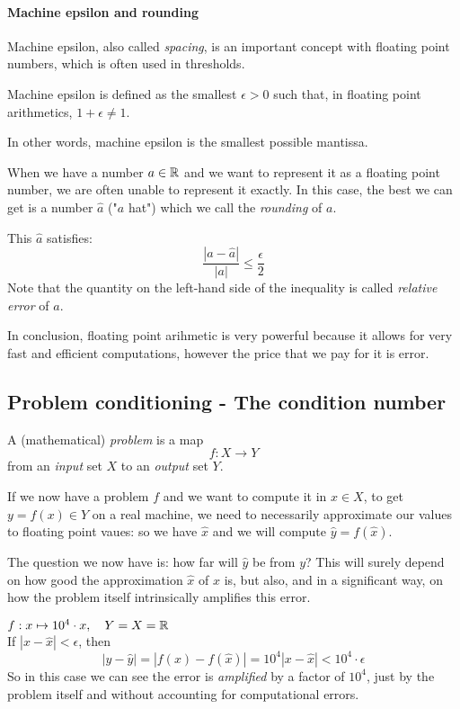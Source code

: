 \paragraph{Machine epsilon and rounding}
Machine epsilon, also called \emph{spacing}, is an important concept with floating point numbers, which is often used in thresholds.
\begin{Def}
	Machine epsilon is defined as the smallest $\epsilon > 0$ such that, in floating point arithmetics, $1 + \epsilon \neq 1$.
\end{Def}
In other words, machine epsilon is the smallest possible mantissa.

When we have a number $a \in \mathbb{R}$ and we want to represent it as a floating point number, we are often unable to represent it exactly. In this case, the best we can get is a number $\hat{a}$ ("$a$ hat") which we call the \emph{rounding} of $a$.

This $\hat{a}$ satisfies:
\begin{equation*}
	\frac{|a - \hat{a}|}{|a|} \leq \frac{\epsilon}{2}
\end{equation*}
Note that the quantity on the left-hand side of the inequality is called \emph{relative error} of $a$.

In conclusion, floating point arihmetic is very powerful because it allows for very fast and efficient computations, however the price that we pay for it is error.

\subsection[Problem conditioning]{Problem conditioning - The condition number}
\begin{Def}[Problem]
	A (mathematical) \emph{problem} is a map
	\begin{equation*}
		{f : X \rightarrow Y}
	\end{equation*}
	from an \emph{input} set $X$ to an \emph{output} set $Y$.
\end{Def}

If we now have a problem $f$ and we want to compute it in $x \in X$, to get $y = f(x) \in Y$ on a real machine, we need to necessarily approximate our values to floating point vaues: so we have $\hat{x}$ and we will compute $\hat{y} = f(\hat{x})$.

The question we now have is: how far will $\hat{y}$ be from $y$? This will surely depend on how good the approximation $\hat{x}$ of $x$ is, but also, and in a significant way, on how the problem itself intrinsically amplifies this error.
\begin{Ex}
	$f : x \mapsto 10^4 \cdot x,\quad Y = X = \mathbb{R}$\\
	If $|x - \hat{x}| < \epsilon$, then
	\begin{dmath*}
		|y - \hat{y}| = |f(x) - f(\hat{x})| = 10^4 |x - \hat{x}| < 10^4 \cdot \epsilon
	\end{dmath*}
	So in this case we can see the error is \emph{amplified} by a factor of $10^4$, just by the problem itself and without accounting for computational errors.
\end{Ex}

